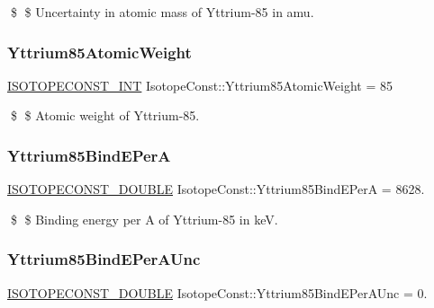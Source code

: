 \$ \$ Uncertainty in atomic mass of Yttrium-\/85 in amu. \mbox{\label{group___isotope_const-_yttrium-_y85_ga638c356334e8ebb6c13b842e583c23ab}} 
\subsubsection{\texorpdfstring{Yttrium85\+Atomic\+Weight}{Yttrium85AtomicWeight}}
{\footnotesize\ttfamily \mbox{\hyperlink{group___isotope_const-_macros_ga5f18360b3e99483a35c32d789e62621c}{I\+S\+O\+T\+O\+P\+E\+C\+O\+N\+S\+T\+\_\+\+I\+NT}} Isotope\+Const\+::\+Yttrium85\+Atomic\+Weight = 85}

\$ \$ Atomic weight of Yttrium-\/85. \mbox{\label{group___isotope_const-_yttrium-_y85_ga0af82888704a463ada35e63940f451ff}} 
\subsubsection{\texorpdfstring{Yttrium85\+Bind\+E\+PerA}{Yttrium85BindEPerA}}
{\footnotesize\ttfamily \mbox{\hyperlink{group___isotope_const-_macros_ga8f45a7272ce02c0b4c65c44636ed719a}{I\+S\+O\+T\+O\+P\+E\+C\+O\+N\+S\+T\+\_\+\+D\+O\+U\+B\+LE}} Isotope\+Const\+::\+Yttrium85\+Bind\+E\+PerA = 8628.}

\$ \$ Binding energy per A of Yttrium-\/85 in keV. \mbox{\label{group___isotope_const-_yttrium-_y85_ga87e829637dc3ebc67c40d0bce546f84a}} 
\subsubsection{\texorpdfstring{Yttrium85\+Bind\+E\+Per\+A\+Unc}{Yttrium85BindEPerAUnc}}
{\footnotesize\ttfamily \mbox{\hyperlink{group___isotope_const-_macros_ga8f45a7272ce02c0b4c65c44636ed719a}{I\+S\+O\+T\+O\+P\+E\+C\+O\+N\+S\+T\+\_\+\+D\+O\+U\+B\+LE}} Isotope\+Const\+::\+Yttrium85\+Bind\+E\+Per\+A\+Unc = 0.}

